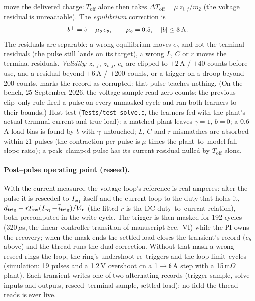 \documentclass[11pt]{article}
\newcommand{\Toff}{T_{\mathrm{off}}}
\begin{document}
move the delivered charge: $\Toff$ alone then takes $\Delta\Toff=\mu\,z_{i,f}/m_2$
(the voltage residual is unreachable). The \emph{equilibrium} correction is
\begin{equation}
b^{+}=b+\mu_b\,e_b,\qquad \mu_b=0.5,\quad |b|\le 3\,{\rm A}.
\end{equation}
The residuals are separable: a wrong equilibrium moves $e_b$ and not the
terminal residuals (the pulse still lands on its target), a wrong $L$, $C$ or $r$
moves the terminal residuals. \emph{Validity:} $z_{i,f}$, $z_{v,f}$, $e_b$ are
clipped to $\pm2$\,A / $\pm40$ counts before use, and a residual beyond $\pm6$\,A /
$\pm200$ counts, or a trigger on a droop beyond 200 counts, marks the record as
corrupted: that pulse teaches nothing. (On the bench, 25 September 2026, the
voltage sample read zero counts; the previous clip--only rule fired a pulse on
every unmasked cycle and ran both learners to their bounds.) Host test
(\texttt{Tests/test\_solve.c}, the learners fed with the plant's actual terminal
current and true load): a matched plant leaves $\gamma=1$, $b=0$; a 0.6\,A load
bias is found by $b$ with $\gamma$ untouched; $L$, $C$ and $r$ mismatches are
absorbed within 21 pulses (the contraction per pulse is $\mu$ times the
plant--to--model fall--slope ratio); a peak--clamped pulse has its current
residual nulled by $\Toff$ alone.

\paragraph{Post--pulse operating point (reseed).}\label{sec:reseed} With the
current measured the voltage loop's reference is real amperes: after the pulse it
is reseeded to $I_{\rm eq}$ itself and the current loop to the duty that holds it,
$d_{\rm trig}+rT_{\rm sw}(I_{\rm eq}-\bar i_{\rm trig})/V_{\rm in}$ (the fitted $r$ is
the DC duty--to--current relation), both precomputed in the write cycle. The
trigger is then masked for 192 cycles (320\,$\mu$s, the linear--controller
transition of manuscript Sec.~VI) while the PI owns the recovery; when the mask
ends the settled load closes the transient's record ($e_b$ above) and the thread
runs the dual correction. Without that mask a wrong reseed rings the loop, the
ring's undershoot re--triggers and the loop limit--cycles (simulation: 19 pulses
and a 1.2\,V overshoot on a 1$\to$6\,A step with a 15\,m$\Omega$ plant). Each
transient writes one of two alternating records (trigger sample, solve inputs
and outputs, reseed, terminal sample, settled load): no field the thread reads is
ever live.
\end{document}
